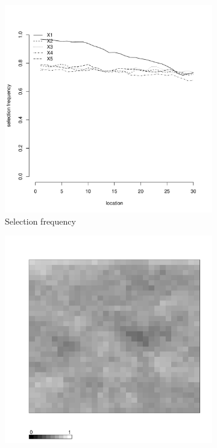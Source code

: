 \documentclass[authoryear, review, 11pt]{elsarticle}
\begin{document}
\begin{figure}
\begin{subfigure}[b]{0.45\textwidth}
		\includegraphics[width=\textwidth]{../../figures/simulation/15.24.profile_selection.pdf}
		\caption{Selection frequency}
	\end{subfigure}
	\begin{subfigure}[b]{0.45\textwidth}
	\centering
		\includegraphics[width=\textwidth]{../../figures/simulation/X1.15.24.unshrunk_bootstrap_coverage.pdf}

\end{subfigure}
\end{figure}
\end{document}
